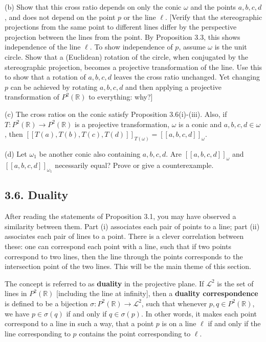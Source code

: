 \documentclass[leqno]{book}
\begin{document}
\begin{enumerate}
(b) Show that this cross ratio depends on only the conic $\omega$ and the points $a,b,c,d$, and does not depend on the point $p$ or the line $\ell$.  [Verify that the stereographic projections from the same point to different lines differ by the perspective projection between the lines from the point.  By Proposition 3.3, this shows independence of the line $\ell$.  To show independence of $p$, assume $\omega$ is the unit circle.  Show that a (Euclidean) rotation of the circle, when conjugated by the stereographic projection, becomes a projective transformation of the line.  Use this to show that a rotation of $a,b,c,d$ leaves the cross ratio unchanged.  Yet changing $p$ can be achieved by rotating $a,b,c,d$ and then applying a projective transformation of $P^2(\mathbb R)$ to everything: why?]

(c) The cross ratios on the conic satisfy Proposition 3.6(i)-(iii).  Also, if $T:P^2(\mathbb R)\to P^2(\mathbb R)$ is a projective transformation, $\omega$ is a conic and $a,b,c,d\in\omega$, then $[\![T(a),T(b),T(c),T(d)]\!]_{T(\omega)}=[\![a,b,c,d]\!]_\omega$.

(d) Let $\omega_1$ be another conic also containing $a,b,c,d$.  Are $[\![a,b,c,d]\!]_\omega$ and $[\![a,b,c,d]\!]_{\omega_1}$ necessarily equal?  Prove or give a counterexample.
\end{enumerate}

\subsection*{3.6. Duality}
After reading the statements of Proposition 3.1, you may have observed a similarity between them.  Part (i) associates each pair of points to a line; part (ii) associates each pair of lines to a point.  There is a clever correlation between these: one can correspond each point with a line, such that if two points correspond to two lines, then the line through the points corresponds to the intersection point of the two lines.  This will be the main theme of this section.

The concept is referred to as \textbf{duality} in the projective plane.  If $\mathcal L^2$ is the set of lines in $P^2(\mathbb R)$ [including the line at infinity], then a \textbf{duality correspondence} is defined to be a bijection $\sigma:P^2(\mathbb R)\to\mathcal L^2$, such that whenever $p,q\in P^2(\mathbb R)$, we have $p\in\sigma(q)$ if and only if $q\in\sigma(p)$.  In other words, it makes each point correspond to a line in such a way, that a point $p$ is on a line $\ell$ if and only if the line corresponding to $p$ contains the point corresponding to $\ell$.
\end{document}

